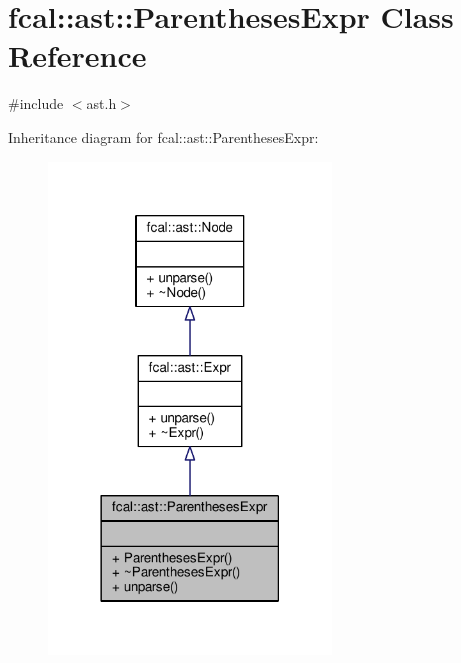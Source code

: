 \hypertarget{classfcal_1_1ast_1_1ParenthesesExpr}{}\section{fcal\+:\+:ast\+:\+:Parentheses\+Expr Class Reference}
\label{classfcal_1_1ast_1_1ParenthesesExpr}


{\ttfamily \#include $<$ast.\+h$>$}



Inheritance diagram for fcal\+:\+:ast\+:\+:Parentheses\+Expr\+:
\nopagebreak
\begin{figure}[H]
\begin{center}
\leavevmode
\includegraphics[width=213pt]{classfcal_1_1ast_1_1ParenthesesExpr__inherit__graph}
\end{center}
\end{figure}


